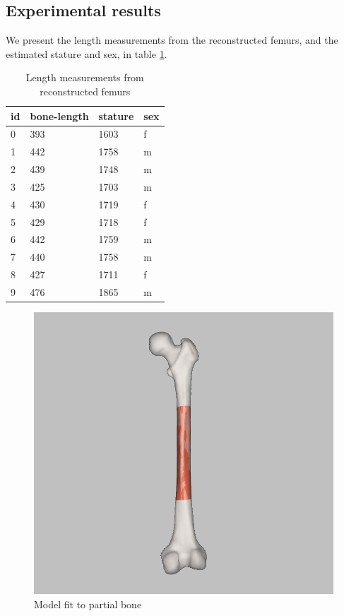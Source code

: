 \documentclass[10pt]{article}
\theoremstyle{definition}
\begin{document}
\subsection{Experimental results}
We present the length measurements from the reconstructed femurs, and the estimated stature and sex, in table \ref{table:2}.

\begin{table}[h!]
    \centering
    \begin{tabular}{l|l|l|l}
        id & bone-length & stature & sex \\ \hline
        0 & 393  & 1603 & f \\ \hline
        1 & 442  & 1758 & m \\ \hline
        2 &  439 & 1748 & m \\ \hline
        3 &  425 & 1703 & m \\ \hline
        4 &  430 & 1719 & f \\ \hline
        5 &  429 & 1718 & f \\ \hline
        6 &  442 & 1759 & m \\ \hline
        7 &  440 & 1758 & m \\ \hline
        8 &  427 & 1711 & f \\ \hline
        9 &  476 & 1865 & m \\

    \end{tabular}
    \caption{Length measurements from reconstructed femurs}
    \label{table:2}
\end{table}

\begin{figure}[h!]
\includegraphics[scale=0.3]{fit1.png}
\centering
\caption{Model fit to partial bone}
\label{fig:5}
\end{figure}
\end{document}
